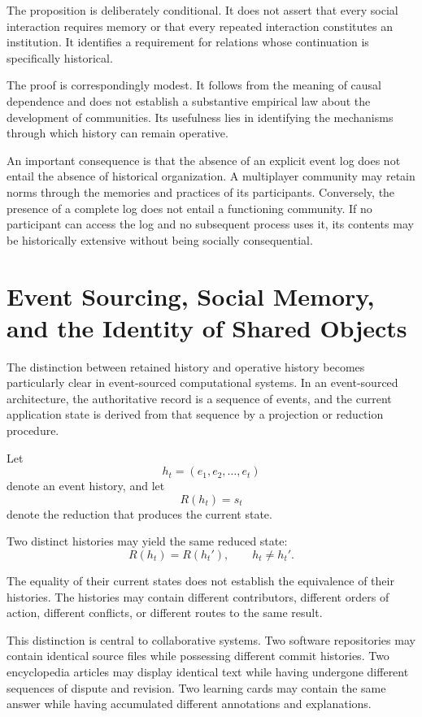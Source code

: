 \documentclass[11pt]{article}
\theoremstyle{remark}
\begin{document}
The proposition is deliberately conditional. It does not
assert that every social interaction requires memory or
that every repeated interaction constitutes an institution.
It identifies a requirement for relations whose
continuation is specifically historical.

The proof is correspondingly modest. It follows from
the meaning of causal dependence and does not establish
a substantive empirical law about the development of
communities. Its usefulness lies in identifying the
mechanisms through which history can remain operative.

An important consequence is that the absence of an
explicit event log does not entail the absence of
historical organization. A multiplayer community may
retain norms through the memories and practices of
its participants. Conversely, the presence of a complete
log does not entail a functioning community. If no
participant can access the log and no subsequent process
uses it, its contents may be historically extensive
without being socially consequential.

\section{Event Sourcing, Social Memory, and the Identity of Shared Objects}
\label{sec:event-sourcing-social}

The distinction between retained history and operative
history becomes particularly clear in event-sourced
computational systems. In an event-sourced architecture,
the authoritative record is a sequence of events, and
the current application state is derived from that
sequence by a projection or reduction procedure.

Let
\[
h_t=(e_1,e_2,\ldots,e_t)
\]
denote an event history, and let
\[
R(h_t)=s_t
\]
denote the reduction that produces the current state.

Two distinct histories may yield the same reduced state:
\[
R(h_t)=R(h_t'),
\qquad
h_t\neq h_t'.
\]

The equality of their current states does not establish
the equivalence of their histories. The histories may
contain different contributors, different orders of
action, different conflicts, or different routes to
the same result.

This distinction is central to collaborative systems.
Two software repositories may contain identical source
files while possessing different commit histories.
Two encyclopedia articles may display identical text
while having undergone different sequences of dispute
and revision. Two learning cards may contain the same
answer while having accumulated different annotations
and explanations.
\end{document}
